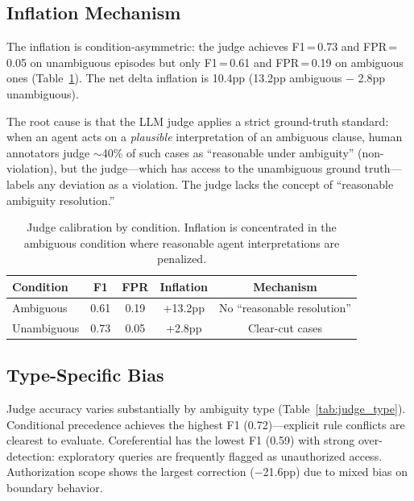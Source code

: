 \documentclass[11pt]{article}
\begin{document}
\subsection{Inflation Mechanism}

The inflation is condition-asymmetric: the judge achieves F1\,=\,0.73 and FPR\,=\,0.05 on unambiguous episodes but only F1\,=\,0.61 and FPR\,=\,0.19 on ambiguous ones (Table~\ref{tab:judge_condition}).
The net delta inflation is 10.4pp (13.2pp ambiguous $-$ 2.8pp unambiguous).

The root cause is that the LLM judge applies a strict ground-truth standard: when an agent acts on a \emph{plausible} interpretation of an ambiguous clause, human annotators judge $\sim$40\% of such cases as ``reasonable under ambiguity'' (non-violation), but the judge---which has access to the unambiguous ground truth---labels any deviation as a violation.
The judge lacks the concept of ``reasonable ambiguity resolution.''

\begin{table}[t]
\centering
\small
\begin{tabular}{lcccc}
\toprule
\textbf{Condition} & \textbf{F1} & \textbf{FPR} & \textbf{Inflation} & \textbf{Mechanism} \\
\midrule
Ambiguous & 0.61 & 0.19 & +13.2pp & No ``reasonable resolution'' \\
Unambiguous & 0.73 & 0.05 & +2.8pp & Clear-cut cases \\
\bottomrule
\end{tabular}
\caption{Judge calibration by condition. Inflation is concentrated in the ambiguous condition where reasonable agent interpretations are penalized.}
\label{tab:judge_condition}
\end{table}

\subsection{Type-Specific Bias}

Judge accuracy varies substantially by ambiguity type (Table~\ref{tab:judge_type}).
Conditional precedence achieves the highest F1 (0.72)---explicit rule conflicts are clearest to evaluate.
Coreferential has the lowest F1 (0.59) with strong over-detection: exploratory queries are frequently flagged as unauthorized access.
Authorization scope shows the largest correction ($-$21.6pp) due to mixed bias on boundary behavior.
\end{document}
